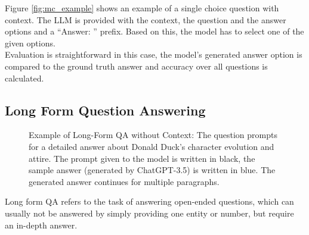 Figure \ref{fig:mc_example} shows an example of a single choice question with context.
The LLM is provided with the context, the question and the answer options and a ``Answer: '' prefix.
Based on this, the model has to select one of the given options.
\\
Evaluation is straightforward in this case, the model's generated answer option is compared to the ground truth answer and accuracy over all questions is calculated.

\subsection{Long Form Question Answering}\label{sec:long-form-qa}
\begin{figure}[tb]
    \centering
    \caption{Example of Long-Form QA without Context: The question prompts for a detailed answer about Donald Duck's character evolution and attire. The prompt given to the model is written in black, the sample answer (generated by ChatGPT-3.5) is written in blue. The generated answer continues for multiple paragraphs.}
    \label{fig:long_form_qa_example_with_answer}
\end{figure}
Long form QA refers to the task of answering open-ended questions, which can usually not be answered by simply providing one entity or number, but require an in-depth answer.
